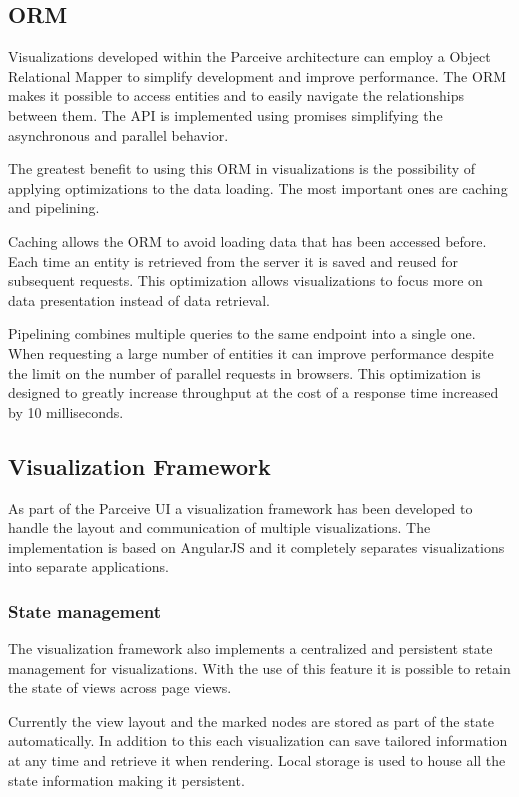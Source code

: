\documentclass[conference]{IEEEtran}
\begin{document}
\subsection{ORM}

Visualizations developed within the Parceive architecture can employ a Object Relational Mapper to simplify development and improve performance. The ORM makes it possible to access entities and to easily navigate the relationships between them. The API is implemented using promises \cite{promises} simplifying the asynchronous and parallel behavior.

The greatest benefit to using this ORM in visualizations is the possibility of applying optimizations to the data loading. The most important ones are caching and pipelining.

Caching allows the ORM to avoid loading data that has been accessed before. Each time an entity is retrieved from the server it is saved and reused for subsequent requests. This optimization allows visualizations to focus more on data presentation instead of data retrieval.

Pipelining combines multiple queries to the same endpoint into a single one. When requesting a large number of entities it can improve performance despite the limit on the number of parallel requests in browsers. This optimization is designed to greatly increase throughput at the cost of a response time increased by 10 milliseconds.

\subsection{Visualization Framework}

As part of the Parceive UI a visualization framework has been developed to handle the layout and communication of multiple visualizations. The implementation is based on AngularJS and it completely separates visualizations into separate applications.

\subsubsection{State management}

The visualization framework also implements a centralized and persistent state management for visualizations. With the use of this feature it is possible to retain the state of views across page views.

Currently the view layout and the marked nodes are stored as part of the state automatically. In addition to this each visualization can save tailored information at any time and retrieve it when rendering. Local storage is used to house all the state information making it persistent.
\end{document}
